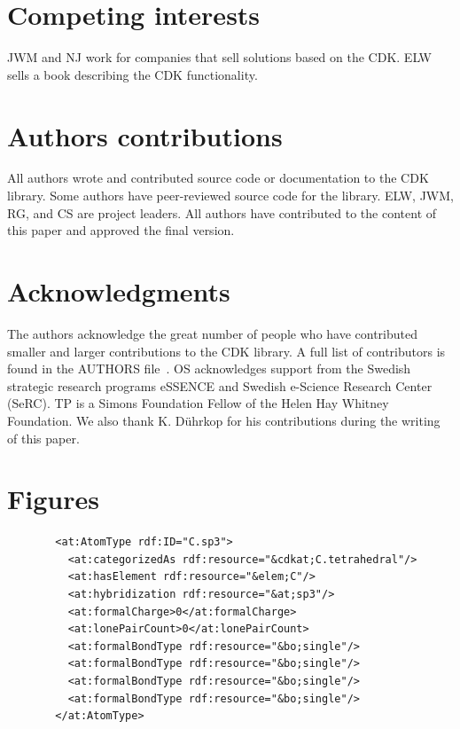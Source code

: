 \documentclass[10pt]{bmcart}
\begin{document}
\begin{backmatter}

\section*{Competing interests}
JWM and NJ work for companies that sell solutions based on the CDK. ELW sells
a book describing the CDK functionality.

\section*{Authors contributions}
All authors wrote and contributed source code or documentation to the CDK
library. Some authors have peer-reviewed source code for the library.
ELW, JWM, RG, and CS are project leaders. All authors have contributed to the
content of this paper and approved the final version.

\section*{Acknowledgments}
The authors acknowledge the great number of people who have contributed smaller
and larger contributions to the CDK library. A full list of contributors is
found in the AUTHORS file~\cite{AUTHORS}. OS acknowledges support from the Swedish strategic research programs eSSENCE and Swedish e-Science Research Center (SeRC). TP is a Simons Foundation Fellow of the Helen Hay Whitney Foundation.
We also thank K. Dührkop for his contributions during the writing of this paper.




\newpage

\section*{Figures}

\begin{figure}[h!]
\caption{}
\begin{verbatim}
  <at:AtomType rdf:ID="C.sp3">
    <at:categorizedAs rdf:resource="&cdkat;C.tetrahedral"/>
    <at:hasElement rdf:resource="&elem;C"/>
    <at:hybridization rdf:resource="&at;sp3"/>
    <at:formalCharge>0</at:formalCharge>
    <at:lonePairCount>0</at:lonePairCount>
    <at:formalBondType rdf:resource="&bo;single"/>
    <at:formalBondType rdf:resource="&bo;single"/>
    <at:formalBondType rdf:resource="&bo;single"/>
    <at:formalBondType rdf:resource="&bo;single"/>
  </at:AtomType>
\end{verbatim}
  \label{fig:atomtype}
\end{figure}



\end{backmatter}
\end{document}
